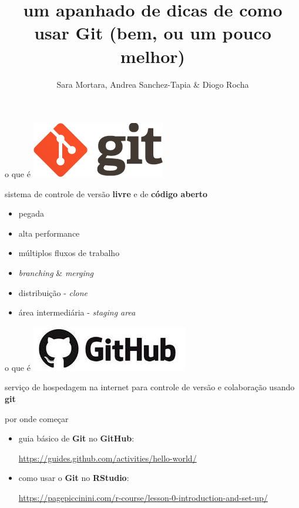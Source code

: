 \documentclass[11pt]{beamer}
\author{Sara Mortara, Andrea Sanchez-Tapia \& Diogo Rocha}
\title{um apanhado de dicas de como usar Git (bem, ou um pouco melhor)}
\begin{document}
\begin{frame}
\titlepage
\end{frame}


\begin{frame}{o que é \includegraphics[scale=0.2]{logo-git.png}}

sistema de controle de versão \textbf{livre} e de \textbf{código aberto}

\begin{itemize}
\item pegada
\item alta performance
\item múltiplos fluxos de trabalho
\item \textit{branching} & \textit{merging}
\item distribuição - \textit{clone}
\item área intermediária - \textit{staging area}
\end{itemize}

\end{frame}

\begin{frame}{o que é \includegraphics[scale=0.2]{github.jpeg}}

serviço de hospedagem na internet para controle de versão e colaboração usando \textbf{git}

\begin{itemize}

\end{itemize}

\end{frame}


\begin{frame}{por onde começar}

\begin{itemize}
\item guia básico de \textbf{Git} no \textbf{GitHub}:

\subitem \href{https://guides.github.com/activities/hello-world/}{https://guides.github.com/activities/hello-world/}

\item como usar o \textbf{Git} no \textbf{RStudio}:

\subitem \href{https://pagepiccinini.com/r-course/lesson-0-introduction-and-set-up/}{https://pagepiccinini.com/r-course/lesson-0-introduction-and-set-up/}

\end{itemize}

\end{frame}
\end{document}
